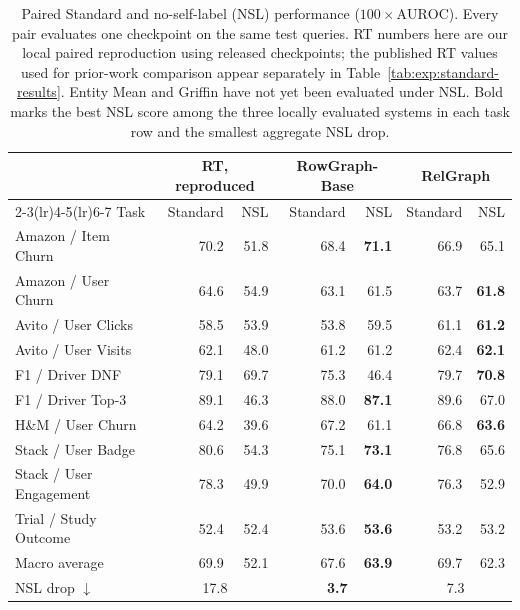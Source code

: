 \begin{table}[t]
  \centering
  \caption{Paired Standard and no-self-label (NSL) performance
  (\(100\times\mathrm{AUROC}\)). Every pair evaluates one checkpoint on
  the same test queries. RT numbers here are our local paired reproduction
  using released checkpoints; the published RT values used for prior-work
  comparison appear separately in Table~\ref{tab:exp:standard-results}.
  Entity Mean and Griffin have not yet been evaluated under NSL. Bold marks
  the best NSL score among the three locally evaluated systems in each task
  row and the smallest aggregate NSL drop.}
  \label{tab:exp:nsl-results}
  \footnotesize
  \setlength{\tabcolsep}{4pt}
  \begin{tabular}{lrrrrrr}
    \toprule
    & \multicolumn{2}{c}{RT, reproduced}
    & \multicolumn{2}{c}{RowGraph-Base}
    & \multicolumn{2}{c}{RelGraph} \\
    \cmidrule(lr){2-3}\cmidrule(lr){4-5}\cmidrule(lr){6-7}
    Task & Standard & NSL & Standard & NSL & Standard & NSL \\
    \midrule
    Amazon / Item Churn
      & 70.2 & 51.8 & 68.4 & \textbf{71.1} & 66.9 & 65.1 \\
    Amazon / User Churn
      & 64.6 & 54.9 & 63.1 & 61.5 & 63.7 & \textbf{61.8} \\
    Avito / User Clicks
      & 58.5 & 53.9 & 53.8 & 59.5 & 61.1 & \textbf{61.2} \\
    Avito / User Visits
      & 62.1 & 48.0 & 61.2 & 61.2 & 62.4 & \textbf{62.1} \\
    F1 / Driver DNF
      & 79.1 & 69.7 & 75.3 & 46.4 & 79.7 & \textbf{70.8} \\
    F1 / Driver Top-3
      & 89.1 & 46.3 & 88.0 & \textbf{87.1} & 89.6 & 67.0 \\
    H\&M / User Churn
      & 64.2 & 39.6 & 67.2 & 61.1 & 66.8 & \textbf{63.6} \\
    Stack / User Badge
      & 80.6 & 54.3 & 75.1 & \textbf{73.1} & 76.8 & 65.6 \\
    Stack / User Engagement
      & 78.3 & 49.9 & 70.0 & \textbf{64.0} & 76.3 & 52.9 \\
    Trial / Study Outcome
      & 52.4 & 52.4 & 53.6 & \textbf{53.6} & 53.2 & 53.2 \\
    \midrule
    Macro average
      & 69.9 & 52.1 & 67.6 & \textbf{63.9} & 69.7 & 62.3 \\
    NSL drop \(\downarrow\)
      & \multicolumn{2}{c}{17.8}
      & \multicolumn{2}{c}{\textbf{3.7}}
      & \multicolumn{2}{c}{7.3} \\
    \bottomrule
  \end{tabular}
\end{table}

